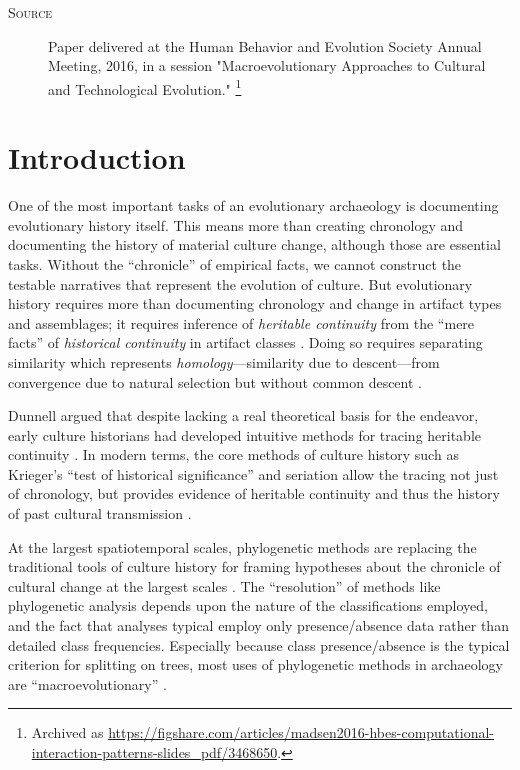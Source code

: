 
\begin{description}
    \item[\textsc{Source}]  Paper delivered at the Human Behavior and Evolution Society Annual Meeting, 2016, in a session "Macroevolutionary Approaches to Cultural and Technological Evolution."  
    \footnote{Archived as \url{https://figshare.com/articles/madsen2016-hbes-computational-interaction-patterns-slides_pdf/3468650}.}
    \end{description}
    
    
    \section{Introduction}\label{metapop:sec:introduction}
    
    One of the most important tasks of an evolutionary archaeology is documenting evolutionary history itself.  This means more than creating chronology and documenting the history of material culture change, although those are essential tasks.  Without the ``chronicle'' \citep{OHara1988} of empirical facts, we cannot construct the testable narratives that represent the evolution of culture.  But evolutionary history requires more than documenting chronology and change in artifact types and assemblages; it requires inference of \emph{heritable continuity} from the ``mere facts'' of \emph{historical continuity} in artifact classes \citep{o2000applying}.  Doing so requires separating similarity which represents \emph{homology}---similarity due to descent---from convergence due to natural selection but without common descent \citep{Dunnell1978,kroeber1931historical}.  
    
    Dunnell \citeyearpar{Dunnell1978,Dunnell1980,Dunnell1989} argued that despite lacking a real theoretical basis for the endeavor, early culture historians had developed intuitive methods for tracing heritable continuity \citep{o2000applying,lyman1997rise}.  In modern terms, the core methods of culture history such as Krieger's \citeyearpar{Krieger1944} ``test of historical significance'' and seriation \citep{Dunnell1970,Ford1935a,Ford1936,Ford1949} allow the tracing not just of chronology, but provides evidence of heritable continuity and thus the history of past cultural transmission \citep{lyman2008cultural}.
    
    At the largest spatiotemporal scales, phylogenetic methods are replacing the traditional tools of culture history for framing hypotheses about the chronicle of cultural change at the largest scales  \citep{borgerhoff2006cultural,lyman1997rise,Lyman2006a,o1999seriation,o2000time,o2001cladistics,o2003cladistics,o2003resolving,OBrian2000,prentiss2019cultural,PRENTISS201564,Temkin2007}.  The ``resolution'' of methods like phylogenetic analysis depends upon the nature of the classifications employed, and the fact that analyses typical employ only presence/absence data rather than detailed class frequencies.  Especially because class presence/absence is the typical criterion for splitting on trees, most uses of phylogenetic methods in archaeology are ``macroevolutionary'' \citep{prentiss2019cultural}.  
    
